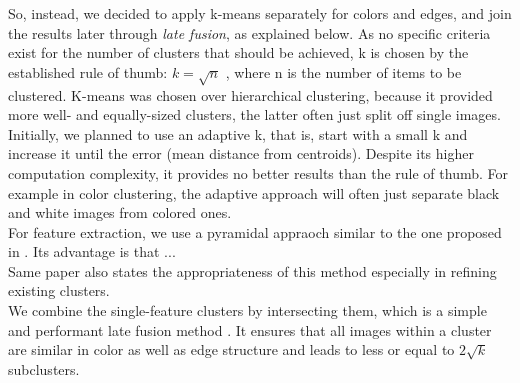 So, instead, we decided to apply k-means separately for colors and edges, and join the results later through \emph{late fusion}, as explained below. As no specific criteria exist for the number of clusters that should be achieved, k is chosen by the established rule of thumb: $ k = \sqrt{n} $ , where n is the number of items to be clustered. K-means was chosen over hierarchical clustering, because it provided more well- and equally-sized clusters, the latter often just split off single images.\\
Initially, we planned to use an adaptive k, that is, start with a small k and increase it until the error (mean distance from centroids). Despite its higher computation complexity, it provides no better results than the rule of thumb. For example in color clustering, the adaptive approach will often just separate black and white images from colored ones.\\
For feature extraction, we use a pyramidal appraoch similar to the one proposed in \cite{Lazebnik2006}. Its advantage is that ... \\
Same paper also states the appropriateness of this method especially in refining existing clusters.\\
We combine the single-feature clusters by intersecting them, which is a simple and performant late fusion method . It ensures that all images within a cluster are similar in color as well as edge structure and leads to less or equal to $ 2\sqrt{k} $ subclusters.
